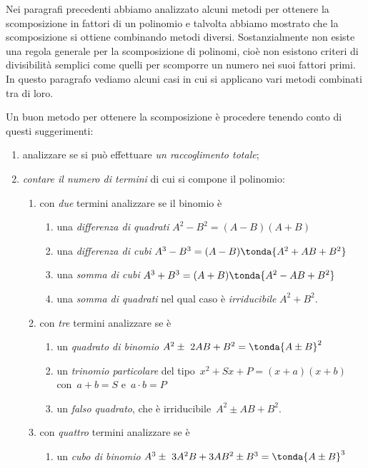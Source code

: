 Nei paragrafi precedenti abbiamo analizzato alcuni metodi per ottenere
la scomposizione in fattori di un polinomio e talvolta abbiamo mostrato
che la scomposizione si ottiene combinando metodi diversi.
Sostanzialmente non esiste una regola generale per la scomposizione di
polinomi, cioè non esistono criteri di divisibilità semplici come
quelli per scomporre un numero nei suoi fattori primi. In questo
paragrafo vediamo alcuni casi in cui si applicano vari metodi combinati
tra di loro.

Un buon metodo per ottenere la scomposizione è procedere tenendo conto
di questi suggerimenti:


\begin{enumerate}
\item analizzare se si può effettuare \emph{un raccoglimento totale};
\item \emph{contare il numero di termini} di cui si compone il polinomio:
\begin{enumerate}
\item con \emph{due} termini analizzare se il binomio è
  \begin{enumerate}
\item una \emph{differenza di quadrati} 
  \(A^{2}-B^{2}=(A-B)(A+B)\)
\item una \emph{differenza di cubi}
  \(A^{3}-B^{3}=(A-B)\tonda{A^{2}+AB+B^{2}}\)
\item una \emph{somma di cubi} 
  \(A^{3}+B^{3}=(A+B)\tonda{A^{2}-AB+B^{2}}\)
\item una \emph{somma di quadrati} nel qual caso è \emph{irriducibile} 
  \(A^{2}+B^{2}\).
  \end{enumerate}
\item con \emph{tre} termini analizzare se è
  \begin{enumerate}
\item un \emph{quadrato di binomio} 
  \(A^{2}\pm~2AB+B^{2}=\tonda{A\pm B}^{2}\)
\item un \emph{trinomio particolare} del tipo~\(x^2+Sx+P=(x+a)(x+b)\) \\
  con~\(a+b=S\) e~\(a\cdot b=P\)
\item un \emph{falso quadrato}, che è irriducibile~\(A^{2}\pm AB+B^{2}\).
  \end{enumerate}
\item con \emph{quattro} termini analizzare se è
  \begin{enumerate}
\item un \emph{cubo di binomio} 
  \(A^{3}\pm~3A^{2}B+3AB^{2}\pm B^{3}=\tonda{A\pm B}^{3}\)

\end{enumerate}
\end{enumerate}
\end{enumerate}
